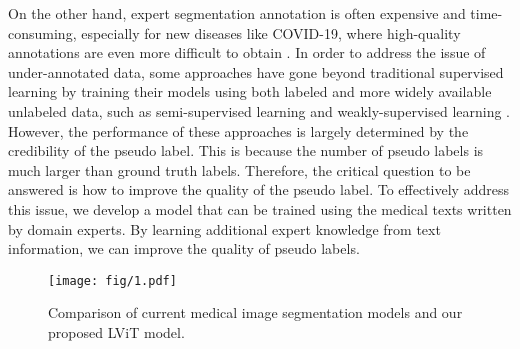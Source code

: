 \documentclass[lettersize,journal]{IEEEtran}
\begin{document}
On the other hand, expert segmentation annotation is often expensive and time-consuming, especially for new diseases like COVID-19, where high-quality annotations are even more difficult to obtain \cite{1zhang2021self, li2022tfcns, yu2022transfer}. In order to address the issue of under-annotated data, some approaches have gone beyond traditional supervised learning by training their models using both labeled and more widely available unlabeled data, such as semi-supervised learning \cite{2li2021dual,4yu2019uncertainty} and weakly-supervised learning \cite{5feng2017discriminative}. However, the performance of these approaches is largely determined by the credibility of the pseudo label. This is because the number of pseudo labels is much larger than ground truth labels. Therefore, the critical question to be answered is how to improve the quality of the pseudo label. To effectively address this issue, we develop a model that can be trained using the medical texts written by domain experts. By learning additional expert knowledge from text information, we can improve the quality of pseudo labels.
\begin{figure*}[]\centering
  \texttt{[image: fig/1.pdf]}
  \caption{Comparison of current medical image segmentation models and our proposed LViT model.}\label{comp}
  \vspace{-1mm}
\end{figure*}
\end{document}

